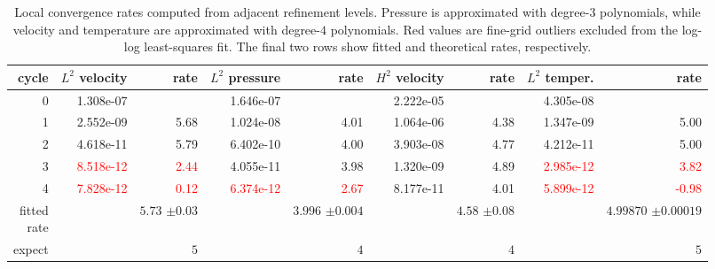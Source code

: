 \begin{table}[htbp]
\centering
\begin{tabular}{|r|r|r|r|r|r|r|r|r|}
\hline
cycle & \makecell{$L^{2}$\\velocity} & rate & \makecell{$L^{2}$\\pressure} & rate & \makecell{$H^{2}$\\velocity} & rate & \makecell{$L^{2}$\\temper.} & rate \\ \hline
0 & 1.308e-07 & \makecell{--} & 1.646e-07 & \makecell{--} & 2.222e-05 & \makecell{--} & 4.305e-08 & \makecell{--} \\ \hline
1 & 2.552e-09 & 5.68 & 1.024e-08 & 4.01 & 1.064e-06 & 4.38 & 1.347e-09 & 5.00 \\ \hline
2 & 4.618e-11 & 5.79 & 6.402e-10 & 4.00 & 3.903e-08 & 4.77 & 4.212e-11 & 5.00 \\ \hline
3 & \textcolor{red}{8.518e-12} & \textcolor{red}{2.44} & 4.055e-11 & 3.98 & 1.320e-09 & 4.89 & \textcolor{red}{2.985e-12} & \textcolor{red}{3.82} \\ \hline
4 & \textcolor{red}{7.828e-12} & \textcolor{red}{0.12} & \textcolor{red}{6.374e-12} & \textcolor{red}{2.67} & 8.177e-11 & 4.01 & \textcolor{red}{5.899e-12} & \textcolor{red}{-0.98} \\ \hline
\makecell[r]{fitted\\rate} & \makecell{--} & \makecell[r]{$5.73 $\\$\pm  0.03$} & \makecell{--} & \makecell[r]{$3.996 $\\$\pm  0.004$} & \makecell{--} & \makecell[r]{$4.58 $\\$\pm  0.08$} & \makecell{--} & \makecell[r]{$4.99870 $\\$\pm  0.00019$} \\ \hline
expect & \makecell{--} & $5$ & \makecell{--} & $4$ & \makecell{--} & $4$ & \makecell{--} & $5$ \\ \hline
\end{tabular}
\caption{Local convergence rates computed from adjacent refinement levels. Pressure is approximated with degree-$3$ polynomials, while velocity and temperature are approximated with degree-$4$ polynomials. Red values are fine-grid outliers excluded from the log-log least-squares fit. The final two rows show fitted and theoretical rates, respectively.}
\end{table}
